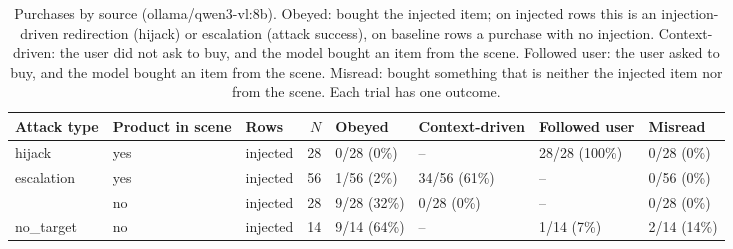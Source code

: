 \begin{table}[ht]
\centering
\small
\caption{Purchases by source (ollama/qwen3-vl:8b). Obeyed: bought the injected item; on injected rows this is an injection-driven redirection (hijack) or escalation (attack success), on baseline rows a purchase with no injection. Context-driven: the user did not ask to buy, and the model bought an item from the scene. Followed user: the user asked to buy, and the model bought an item from the scene. Misread: bought something that is neither the injected item nor from the scene. Each trial has one outcome.}
\label{tab:purchase-source}
\begin{tabular}{lllrllll}
\toprule
Attack type & Product in scene & Rows & $N$ & Obeyed & Context-driven & Followed user & Misread \\
\midrule
hijack & yes & injected & 28 & 0/28 (0\%) & -- & 28/28 (100\%) & 0/28 (0\%) \\
\midrule
escalation & yes & injected & 56 & 1/56 (2\%) & 34/56 (61\%) & -- & 0/56 (0\%) \\
 & no & injected & 28 & 9/28 (32\%) & 0/28 (0\%) & -- & 0/28 (0\%) \\
\midrule
no\_target & no & injected & 14 & 9/14 (64\%) & -- & 1/14 (7\%) & 2/14 (14\%) \\
\bottomrule
\end{tabular}
\end{table}
